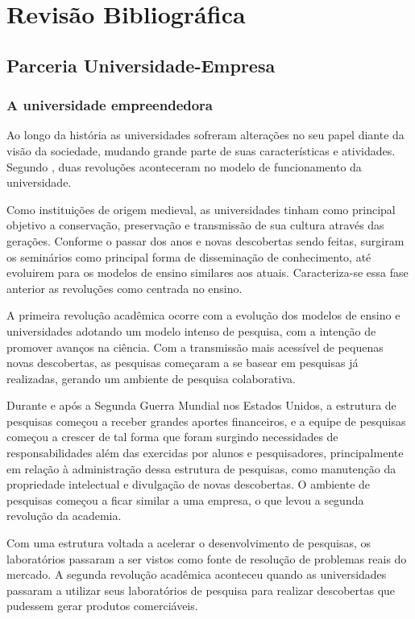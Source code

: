 \chapter[Revisão Bibliográfica]{Revisão Bibliográfica}
\label{chap:revisao}
\section{Parceria Universidade-Empresa}
\label{cha:ensino}
\subsection{A universidade empreendedora}
\label{cha:univ_empreend}

Ao longo da história as universidades sofreram alterações no seu papel diante da visão da sociedade, mudando grande parte de suas características e atividades. Segundo , duas revoluções aconteceram no modelo de funcionamento da universidade.

Como instituições de origem medieval, as universidades tinham como principal objetivo a conservação, preservação e transmissão de sua cultura através das gerações. Conforme o passar dos anos e novas descobertas sendo feitas, surgiram os seminários como principal forma de disseminação de conhecimento, até evoluirem para os modelos de ensino similares aos atuais. Caracteriza-se essa fase anterior as revoluções como centrada no ensino.

A primeira revolução acadêmica ocorre com a evolução dos modelos de ensino e universidades adotando um modelo intenso de pesquisa, com a intenção de promover avanços na ciência. Com a transmissão mais acessível de pequenas novas descobertas, as pesquisas começaram a se basear em pesquisas já realizadas, gerando um ambiente de pesquisa colaborativa. 

Durante e após a Segunda Guerra Mundial nos Estados Unidos, a estrutura de pesquisas começou a receber grandes aportes financeiros, e a equipe de pesquisas começou a crescer de tal forma que foram surgindo necessidades de responsabilidades além das exercidas por alunos e pesquisadores, principalmente em relação à administração dessa estrutura de pesquisas, como manutenção da propriedade intelectual e divulgação de novas descobertas. O ambiente de pesquisas começou a ficar similar a uma empresa, o que levou a segunda revolução da academia.

Com uma estrutura voltada a acelerar o desenvolvimento de pesquisas, os laboratórios passaram a ser vistos como fonte de resolução de problemas reais do mercado. A segunda revolução acadêmica aconteceu quando as universidades passaram a utilizar seus laboratórios de pesquisa para realizar descobertas que pudessem gerar produtos comerciáveis. 

